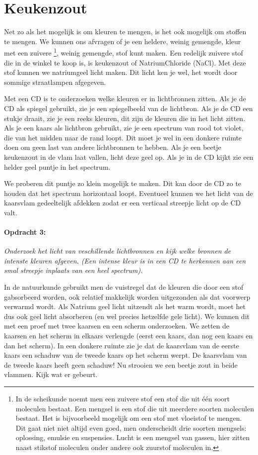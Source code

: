 \newpage{}


\section{Keukenzout}

Net zo als het mogelijk is om kleuren te mengen, is het ook mogelijk om
stoffen te mengen. We kunnen ons afvragen of je een heldere, weinig
gemengde, kleur met een zuivere \footnote{In de scheikunde noemt men een
zuivere stof een stof die uit één soort moleculen bestaat. Een mengsel
is een stof die uit meerdere soorten moleculen bestaat. Het is
bijvoorbeeld mogelijk om een stof met vloeistof te mengen. Dit gaat niet
niet altijd even goed, men onderscheidt drie soorten mengsels:
oplossing, emulsie en suspensies. Lucht is een mengsel van gassen, hier
zitten naast stikstof moleculen onder andere ook zuurstof moleculen in.
}, weinig gemengde, stof kunt maken. Een redelijk zuivere stof die in de
winkel te koop is, is keukenzout of NatriumChloride (NaCl). Met deze
stof kunnen we natriumgeel licht maken. Dit licht ken je wel, het wordt
door sommige straatlampen afgegeven.

Met een CD is te onderzoeken welke kleuren er in lichtbronnen zitten.
Als je de CD als spiegel gebruikt, zie je een spiegelbeeld van de
lichtbron. Als je de CD een stukje draait, zie je een reeks kleuren,
dit zijn de kleuren die in het licht zitten. Als je een kaars als
lichtbron gebruikt, zie je een spectrum van rood tot violet, die van
het midden naar de rand loopt. Dit moet je wel in een donkere ruimte
doen om geen last van andere lichtbronnen te hebben. Als je een beetje
keukenzout in de vlam laat vallen, licht deze geel op. Als je in de
CD kijkt zie een helder geel puntje in het spectrum. 

We proberen dit puntje zo klein mogelijk te maken. Dit kan door de
CD zo te houden dat het spectrum horizontaal loopt. Eventueel kunnen
we het licht van de kaarsvlam gedeeltelijk afdekken zodat er een verticaal
streepje licht op de CD valt.


\paragraph*{Opdracht 3:}

\emph{Onderzoek het licht van veschillende lichtbronnen en kijk welke
bronnen de intenste kleuren afgeven. (Een intense kleur is in een
CD te herkennen aan een smal streepje inplaats van een heel spectrum).}

In de natuurkunde gebruikt men de vuistregel dat de kleuren die door
een stof gabsorbeerd worden, ook relatief makkelijk worden uitgezonden
als dat voorwerp verwarmd wordt. Als Natrium geel licht uitzendt als
het warm wordt, moet het dus ook geel licht absorberen (en wel precies
hetzelfde gele licht). We kunnen dit met een proef met twee kaarsen
en een scherm onderzoeken. We zetten de kaarsen en het scherm in elkaars
verlengde (eerst een kaars, dan nog een kaars en dan het scherm).
In een donkere ruimte zie je dat de kaarsvlam van de eerste kaars
een schaduw van de tweede kaars op het scherm werpt. De kaarsvlam
van de tweede kaars heeft geen schaduw! Nu strooien we een beetje
zout in beide vlammen. Kijk wat er gebeurt.


